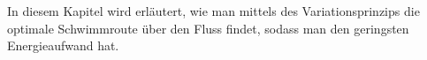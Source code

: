 \begin{refsection}
In diesem Kapitel wird erläutert, wie man mittels des Variationsprinzips die optimale Schwimmroute über den Fluss findet, sodass man den geringsten Energieaufwand hat.










% 
% 
% 
% 


% 



















\end{refsection}
